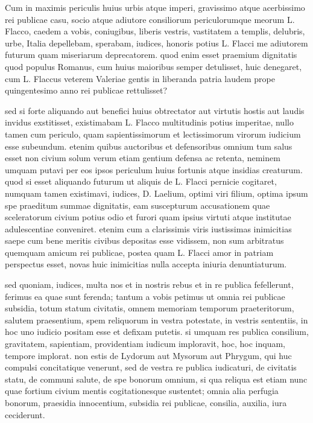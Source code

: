 
 Cum in maximis periculis huius urbis atque imperi, gravissimo atque acerbissimo rei publicae casu, socio atque adiutore consiliorum periculorumque meorum L. Flacco, caedem a vobis, coniugibus, liberis vestris, vastitatem a templis, delubris, urbe, Italia depellebam, sperabam, iudices, honoris potius L. Flacci me adiutorem futurum quam miseriarum deprecatorem. quod enim esset praemium dignitatis quod populus Romanus, cum huius maioribus semper detulisset, huic denegaret, cum L. Flaccus veterem Valeriae gentis in liberanda patria laudem prope quingentesimo anno rei publicae rettulisset?

 sed si forte aliquando aut benefici huius obtrectator aut virtutis hostis aut laudis invidus exstitisset, existimabam L. Flacco multitudinis potius imperitae, nullo tamen cum periculo, quam sapientissimorum et lectissimorum virorum iudicium esse subeundum. etenim quibus auctoribus et defensoribus omnium tum salus esset non civium solum verum etiam gentium defensa ac retenta, neminem umquam putavi per eos ipsos periculum huius fortunis atque insidias creaturum. quod si esset aliquando futurum ut aliquis de L. Flacci pernicie cogitaret, numquam tamen existimavi, iudices, D. Laelium, optimi viri filium, optima ipsum spe praeditum summae dignitatis, eam suscepturum accusationem quae sceleratorum civium potius odio et furori quam ipsius virtuti atque institutae adulescentiae conveniret. etenim cum a clarissimis viris iustissimas inimicitias saepe cum bene meritis civibus depositas esse vidissem, non sum arbitratus quemquam amicum rei publicae, postea quam L. Flacci amor in patriam perspectus esset, novas huic inimicitias nulla accepta iniuria denuntiaturum.

 sed quoniam, iudices, multa nos et in nostris rebus et in re publica fefellerunt, ferimus ea quae sunt ferenda; tantum a vobis petimus ut omnia rei publicae subsidia, totum statum civitatis, omnem memoriam temporum praeteritorum, salutem praesentium, spem reliquorum in vestra potestate, in vestris sententiis, in hoc uno iudicio positam esse et defixam putetis. si umquam res publica consilium, gravitatem, sapientiam, providentiam iudicum imploravit, hoc, hoc inquam, tempore implorat. non estis de Lydorum aut Mysorum aut Phrygum, qui huc compulsi concitatique venerunt, sed de vestra re publica iudicaturi, de civitatis statu, de communi salute, de spe bonorum omnium, si qua reliqua est etiam nunc quae fortium civium mentis cogitationesque sustentet; omnia alia perfugia bonorum, praesidia innocentium, subsidia rei publicae, consilia, auxilia, iura ceciderunt.

